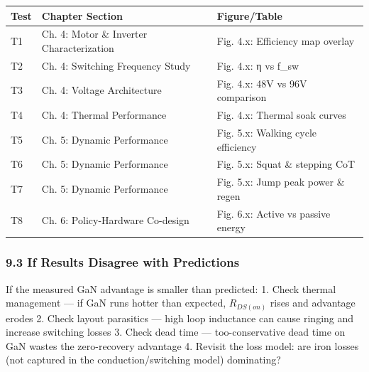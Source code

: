 \documentclass[
]{article}
\newcounter{none} %
\begin{document}
{\def\LTcaptype{none} %
\begin{longtable}[]{@{}
  >{\raggedright\arraybackslash}p{}
  >{\raggedright\arraybackslash}p{}
  >{\raggedright\arraybackslash}p{}@{}}
\toprule\noalign{}
\begin{minipage}[b]{\linewidth}\raggedright
Test
\end{minipage} & \begin{minipage}[b]{\linewidth}\raggedright
Chapter Section
\end{minipage} & \begin{minipage}[b]{\linewidth}\raggedright
Figure/Table
\end{minipage} \\
\midrule\noalign{}
\endhead
\bottomrule\noalign{}
\endlastfoot
T1 & Ch. 4: Motor \& Inverter Characterization & Fig. 4.x: Efficiency
map overlay \\
T2 & Ch. 4: Switching Frequency Study & Fig. 4.x: η vs f\_sw \\
T3 & Ch. 4: Voltage Architecture & Fig. 4.x: 48V vs 96V comparison \\
T4 & Ch. 4: Thermal Performance & Fig. 4.x: Thermal soak curves \\
T5 & Ch. 5: Dynamic Performance & Fig. 5.x: Walking cycle efficiency \\
T6 & Ch. 5: Dynamic Performance & Fig. 5.x: Squat \& stepping CoT \\
T7 & Ch. 5: Dynamic Performance & Fig. 5.x: Jump peak power \& regen \\
T8 & Ch. 6: Policy-Hardware Co-design & Fig. 6.x: Active vs passive
energy \\
\end{longtable}
}

\subsubsection{9.3 If Results Disagree with
Predictions}\label{if-results-disagree-with-predictions}

If the measured GaN advantage is smaller than predicted: 1. Check
thermal management --- if GaN runs hotter than expected, \(R_{DS(on)}\)
rises and advantage erodes 2. Check layout parasitics --- high loop
inductance can cause ringing and increase switching losses 3. Check dead
time --- too-conservative dead time on GaN wastes the zero-recovery
advantage 4. Revisit the loss model: are iron losses (not captured in
the conduction/switching model) dominating?
\end{document}
